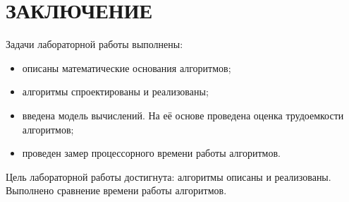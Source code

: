 \chapter*{ЗАКЛЮЧЕНИЕ}

Задачи лабораторной работы выполнены:

\begin{itemize}[label=--]
    \item описаны математические основания алгоритмов;
    \item алгоритмы спроектированы и реализованы;
    \item введена модель вычислений. На её основе проведена оценка трудоемкости алгоритмов;
    \item проведен замер процессорного времени работы алгоритмов.
\end{itemize}

Цель лабораторной работы достигнута: алгоритмы описаны и реализованы. Выполнено сравнение времени работы алгоритмов.
